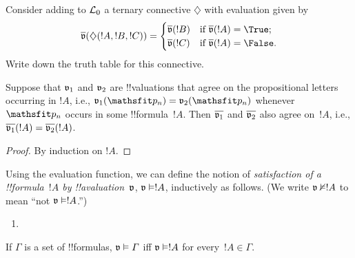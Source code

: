 \documentclass[../../../include/open-logic-section]{subfiles}
\begin{document}
\begin{prob}
Consider adding to $\Lang{L_0}$ a ternary connective $\diamondsuit$ 
with evaluation given by 
\begin{gather*}
  \pValue{v}(\diamondsuit( !A , !B , !C ) ) = \begin{cases} 
    \pValue{v}( !B ) &
    \text{if $\pValue{v}(!A) = \True$;}\\
    \pValue{v}( !C ) &
    \text{if $\pValue{v}(!A) = \False $}.
  \end{cases}
\end{gather*}
Write down the truth table for this connective.
\end{prob}

\begin{thm}  
 Suppose that $\pAssign{v_1}$ and
$\pAssign{v_2}$ are !!{valuation}s that agree on the propositional
letters occurring in $!A$, i.e., $\pAssign{v_1}(\Obj p_n) =
\pAssign{v_2}(\Obj p_n)$ whenever $\Obj p_n$ occurs in some !!{formula}~$!A$. Then $\pValue{v_1}$ and $\pValue{v_2}$ also agree on~$!A$, i.e., $\pValue{v_1}(!A) = \pValue{v_2}(!A)$.
\end{thm}

\begin{proof} 
By induction on $!A$. 
\end{proof}

\begin{defn}[Satisfaction]
 Using the evaluation function, we can
define the notion of \emph{satisfaction of a !!{formula}~$!A$ by
  !!a{valuation}~$\pAssign{v}$}, $\pSat{v}{!A}$, inductively as
  follows. (We write $\pSat/{v}{!A}$ to mean ``not
  $\pSat{v}{!A}$.'')
\begin{enumerate}


\item {}





\end{enumerate}
If $\Gamma$ is a set of !!{formula}s, $\pSat{v}{\Gamma}$ iff
$\pSat{v}{!A}$ for every~$!A \in \Gamma$.
\end{defn}
\end{document}
